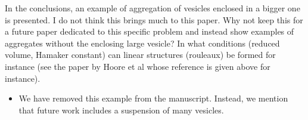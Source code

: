 \documentclass[11pt]{article}
\newcommand{\comment}[1]{{\color{blue} #1}}
\begin{document}
\noindent
\comment{In the conclusions, an example of aggregation of vesicles enclosed
in a bigger one is presented. I do not think this brings much to this
paper. Why not keep this for a future paper dedicated to this specific
problem and instead show examples of aggregates without the enclosing
large vesicle? In what conditions (reduced volume, Hamaker constant)
can linear structures (rouleaux) be formed for instance (see the paper
by Hoore et al whose reference is given above for instance).}
\begin{itemize}
  \item We have removed this example from the manuscript.  Instead, we
    mention that future work includes a suspension of many vesicles.
\end{itemize}
\end{document}
